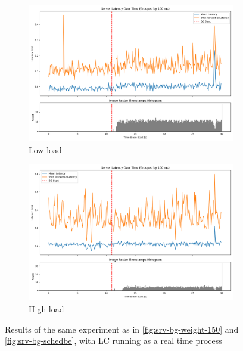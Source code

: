 \begin{figure}[t]
    \centering
    \begin{subfigure}[t]{\columnwidth}
        \includegraphics[width=\columnwidth]{graphs/srv-bg-rt-low.png}
        \caption{Low load}\label{fig:srv-bg-rt-low}
        \vspace{12pt}
    \end{subfigure}
    \hspace{\fill}
    \begin{subfigure}[t]{\columnwidth}
        \includegraphics[width=\columnwidth]{graphs/srv-bg-rt-high.png}
        \caption{High load}\label{fig:srv-bg-rt-high}
    \end{subfigure}
    \vspace{4pt}
    \caption{Results of the same experiment as in \autoref{fig:srv-bg-weight-150}
    and \autoref{fig:srv-bg-schedbe}, with LC running as a real time
    process}\label{fig:srv-bg-rt}
\end{figure}


